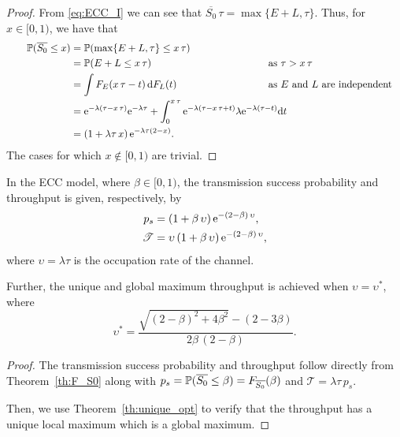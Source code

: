 \begin{proof}
    From \eqref{eq:ECC_I} we can see that $\overline{S_0}\,\tau = \max\{E+L,\tau\}$. Thus, for $x\in[0,1)$, we have that
    \begin{align*}
        \qquad 
        \P(\overline{S_0} \le x)
            &= \P(\max\{E+L,\tau\} \le x\,\tau) \\
            &= \P(E+L \le x\,\tau) &&\hspace{-10mm}\text{as }\tau > x\,\tau\\
            &= \int F_E(x\,\tau - t)\,\d F_L(t) &&\hspace{-10mm}\text{as $E$ and $L$ are independent}\\
            &= \euler^{-\lambda(\tau-x\,\tau)} \euler^{-\lambda\tau} + \int_0^{x\,\tau} \euler^{-\lambda(\tau-x\,\tau+t)} \lambda\euler^{-\lambda(\tau-t)}\d t \\
            &= (1+\lambda\tau\,x)\,\euler^{-\lambda\tau(2-x)}.
    \end{align*}
    The cases for which $x\notin[0,1)$ are trivial.
\end{proof}


\begin{proposition}
	In the ECC model, where $\beta\in[0,1)$, the transmission success probability and throughput is given, respectively, by
    \begin{align*} \label{AlohaECC_thr}
        p_s     &= (1 + \beta\,\upsilon)\,\euler^{-(2-\beta)\,\upsilon},\\
    	\mathscr{T} &= \upsilon\,(1 + \beta\,\upsilon)\,\euler^{-(2-\beta)\,\upsilon},
    \end{align*}
    where $\upsilon = \lambda\tau$ is the occupation rate of the channel.
    
    Further, the unique and global maximum throughput is achieved when $\upsilon = \upsilon^*$, where
    \begin{equation*} \label{AlohaECC_max}
	    \upsilon^* = \frac{\sqrt{(2-\beta)^2+4\beta^2}-(2-3\beta)}{2\beta\,(2-\beta)}.
    \end{equation*}
\end{proposition}
\begin{proof}
    The transmission success probability and throughput follow directly from Theorem~\ref{th:F_S0} along with $p_s = \P(\overline{S_0}\le\beta) = F_{\overline{S_0}}(\beta)$ and $\mathscr{T} = \lambda\tau\,p_s$.
    
    Then, we use Theorem~\ref{th:unique_opt} to verify that the throughput has a unique local maximum which is a global maximum.
\end{proof}

